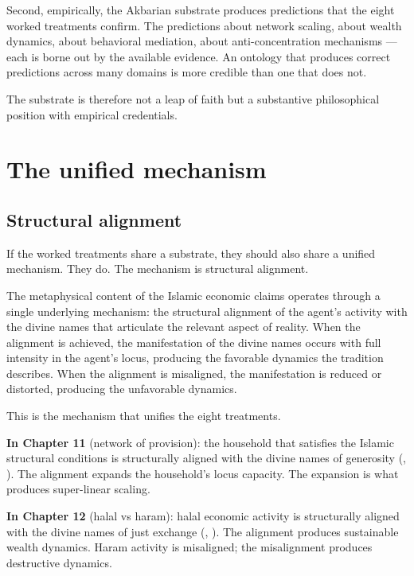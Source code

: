 Second, empirically, the Akbarian substrate produces predictions
that the eight worked treatments confirm. The predictions about
network scaling, about wealth dynamics, about behavioral
mediation, about anti-concentration mechanisms --- each is borne
out by the available evidence. An ontology that produces correct
predictions across many domains is more credible than one that
does not.

The substrate is therefore not a leap of faith but a substantive
philosophical position with empirical credentials.

\section{The unified mechanism}
\label{sec:unified-mechanism}

\subsection{Structural alignment}

If the worked treatments share a substrate, they should also share
a unified mechanism. They do. The mechanism is structural alignment.

\begin{conceptbox}
\label{conc:unified-mechanism}
The metaphysical content of the Islamic economic claims operates
through a single underlying mechanism: the structural alignment of
the agent's activity with the divine names that articulate the
relevant aspect of reality. When the alignment is achieved, the
manifestation of the divine names occurs with full intensity in
the agent's locus, producing the favorable dynamics the tradition
describes. When the alignment is misaligned, the manifestation is
reduced or distorted, producing the unfavorable dynamics.
\end{conceptbox}

This is the mechanism that unifies the eight treatments.

\textbf{In Chapter 11} (network of provision): the household that
satisfies the Islamic structural conditions is structurally
aligned with the divine names of generosity (,
). The alignment expands the household's locus
capacity. The expansion is what produces super-linear scaling.

\textbf{In Chapter 12} (halal vs haram): halal economic activity is
structurally aligned with the divine names of just exchange
(, ). The alignment produces sustainable
wealth dynamics. Haram activity is misaligned; the misalignment
produces destructive dynamics.

